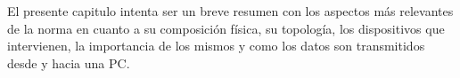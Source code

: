 El presente capitulo intenta ser un breve resumen con los aspectos más relevantes de la norma en cuanto a su composición física, su topología, los dispositivos que intervienen, la importancia de los mismos y como los datos son transmitidos desde y hacia una PC.

%	
%	
%		
